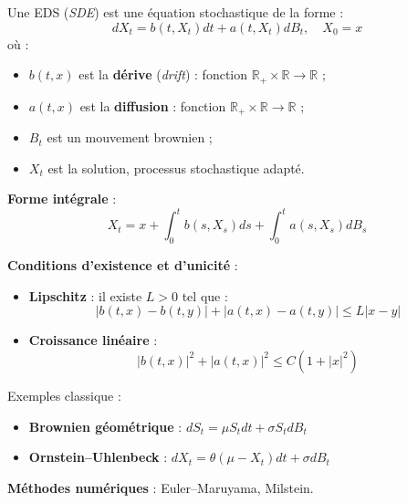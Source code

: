 \begin{f}
	
	Une EDS (\emph{SDE}) est une équation stochastique de la forme :
	\[
	dX_t = b(t, X_t) dt + a(t, X_t) dB_t, \quad X_0 = x
	\]
	où :
	\begin{itemize}
		\item $b(t,x)$ est la \textbf{dérive} (\emph{drift}) : fonction $\mathbb{R}_+ \times \mathbb{R} \to \mathbb{R}$ ;
		\item $a(t,x)$ est la \textbf{diffusion} : fonction $\mathbb{R}_+ \times \mathbb{R} \to \mathbb{R}$ ;
		\item $B_t$ est un mouvement brownien ;
		\item $X_t$ est la solution, processus stochastique adapté.
	\end{itemize}
	
	\textbf{Forme intégrale} :
	\[
	X_t = x + \int_0^t b(s, X_s) ds + \int_0^t a(s, X_s) dB_s
	\]
	
	\textbf{Conditions d’existence et d’unicité} :
	\begin{itemize}
		\item \textbf{Lipschitz} : il existe $L > 0$ tel que :
		\[
		|b(t,x) - b(t,y)| + |a(t,x) - a(t,y)| \leq L |x - y|
		\]
		\item \textbf{Croissance linéaire} :
		\[
		|b(t,x)|^2 + |a(t,x)|^2 \leq C(1 + |x|^2)
		\]
	\end{itemize}
	
Exemples classique :
	\begin{itemize}
		\item \textbf{Brownien géométrique} : $dS_t = \mu S_t dt + \sigma S_t dB_t$
		\item \textbf{Ornstein–Uhlenbeck} : $dX_t = \theta(\mu - X_t) dt + \sigma dB_t$
	\end{itemize}
	
	\textbf{Méthodes numériques} : Euler–Maruyama, Milstein.
	
\end{f}

